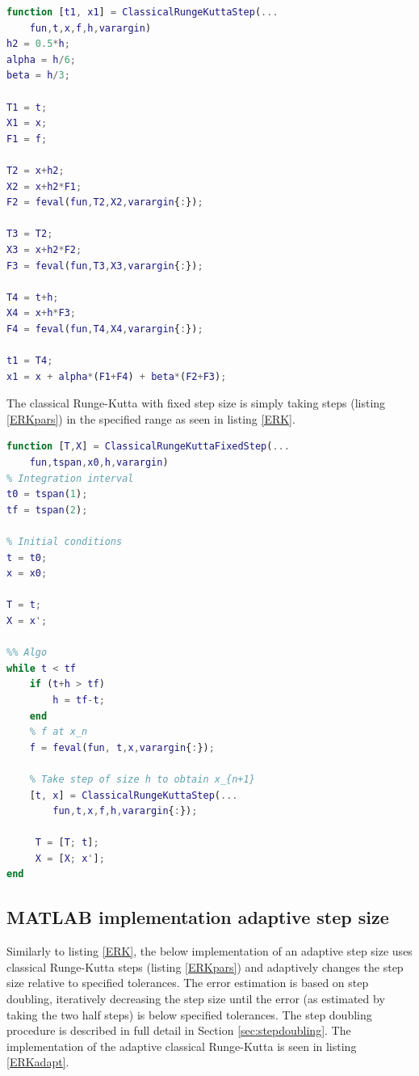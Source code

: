 \begin{adjustwidth*}{0cm}{-0.4cm}
\begin{lstlisting}[frame=single, language=Matlab,caption=Classical Runga-Kutta Step, label=ERKpars]
function [t1, x1] = ClassicalRungeKuttaStep(...
    fun,t,x,f,h,varargin)
h2 = 0.5*h;
alpha = h/6;
beta = h/3;

T1 = t;
X1 = x;
F1 = f;

T2 = x+h2;
X2 = x+h2*F1;
F2 = feval(fun,T2,X2,varargin{:});

T3 = T2;
X3 = x+h2*F2;
F3 = feval(fun,T3,X3,varargin{:});

T4 = t+h;
X4 = x+h*F3;
F4 = feval(fun,T4,X4,varargin{:});

t1 = T4;
x1 = x + alpha*(F1+F4) + beta*(F2+F3);
\end{lstlisting}
\end{adjustwidth*}

The classical Runge-Kutta with fixed step size is simply taking steps (listing \ref{ERKpars}) in the specified range as seen in listing \ref{ERK}.

\begin{adjustwidth*}{0cm}{-0.4cm}
\begin{lstlisting}[frame=single, language=Matlab,caption=Classical Runge-Kutta with fixed step size, label=ERK]
function [T,X] = ClassicalRungeKuttaFixedStep(...
    fun,tspan,x0,h,varargin)
% Integration interval
t0 = tspan(1);
tf = tspan(2);

% Initial conditions
t = t0;
x = x0;

T = t;
X = x';

%% Algo
while t < tf
    if (t+h > tf)
        h = tf-t;
    end
    % f at x_n
    f = feval(fun, t,x,varargin{:});

    % Take step of size h to obtain x_{n+1}
    [t, x] = ClassicalRungeKuttaStep(...
        fun,t,x,f,h,varargin{:});

     T = [T; t];
     X = [X; x'];
end
\end{lstlisting}
\end{adjustwidth*}



\subsection{MATLAB implementation adaptive step size}
Similarly to listing \ref{ERK}, the below implementation of an adaptive step size uses classical Runge-Kutta steps (listing \ref{ERKpars}) and adaptively changes the step size relative to specified tolerances. The error estimation is based on step doubling, iteratively decreasing the step size until the error (as estimated by taking the two half steps) is below specified tolerances. The step doubling procedure is described in full detail in Section \ref{sec:stepdoubling}. The implementation of the adaptive classical Runge-Kutta is seen in listing \ref{ERKadapt}.


